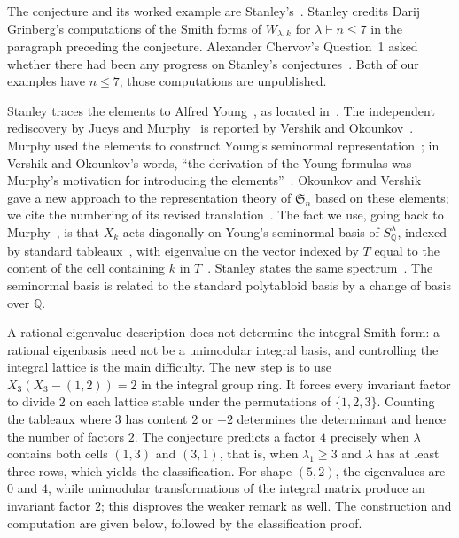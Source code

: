 \documentclass[11pt]{article}
\theoremstyle{remark}
\newcommand{\Q}{\mathbb{Q}}
\begin{document}
The conjecture and its worked example are Stanley's~\cite[Conjecture~7.4
and following example]{stanley}. Stanley credits Darij Grinberg's computations
of the Smith forms of $W_{\lambda,k}$ for $\lambda\vdash n\le7$ in the
paragraph preceding the conjecture. Alexander Chervov's Question~1 asked
whether there had been any progress on Stanley's
conjectures~\cite[Question~1]{mo}. Both of our examples have $n\le7$; those
computations are unpublished.

Stanley traces the elements to Alfred Young~\cite[\S19]{young}, as located
in~\cite[Section~7, paragraph preceding Conjecture~7.4]{stanley}. The
independent rediscovery by Jucys and Murphy~\cite{jucys,murphy} is reported by
Vershik and Okounkov~\cite[Introduction, page~4]{vo}. Murphy used the
elements to construct Young's seminormal representation~\cite{murphy}; in
Vershik and Okounkov's words, ``the derivation of the Young formulas was
Murphy's motivation for introducing the elements''~\cite[page~5]{vo}.
Okounkov and Vershik~\cite{ov} gave a new approach to the representation
theory of $\mathfrak S_n$ based on these elements; we cite the numbering of
its revised translation~\cite{vo}. The fact we use, going back to
Murphy~\cite{murphy}, is that $X_k$ acts diagonally on Young's seminormal
basis of $S^\lambda_\Q$, indexed by standard tableaux~\cite[Corollary~2.10
and Proposition~6.1]{vo}, with eigenvalue on the vector indexed by $T$ equal
to the content of the cell containing $k$ in $T$~\cite[Theorem~5.8]{vo}.
Stanley states the same spectrum~\cite[Section~7, page~15]{stanley}. The
seminormal basis is related to the standard polytabloid basis by a change of
basis over $\Q$.

A rational eigenvalue description does not determine the integral Smith
form: a rational eigenbasis need not be a unimodular integral basis, and
controlling the integral lattice is the main difficulty. The new step is to
use $X_3(X_3-(1,2))=2$ in the integral group ring. It forces every invariant
factor to divide $2$ on each lattice stable under the permutations of
$\{1,2,3\}$. Counting the tableaux where $3$ has content $2$ or $-2$
determines the determinant and hence the number of factors $2$. The
conjecture predicts a factor $4$ precisely when $\lambda$ contains both cells
$(1,3)$ and $(3,1)$, that is, when $\lambda_1\ge3$ and $\lambda$ has at least
three rows, which yields the classification. For shape $(5,2)$, the
eigenvalues are $0$ and $4$, while unimodular transformations of the integral
matrix produce an invariant factor $2$; this disproves the weaker remark as
well. The construction and computation are given below, followed by the
classification proof.
\end{document}
